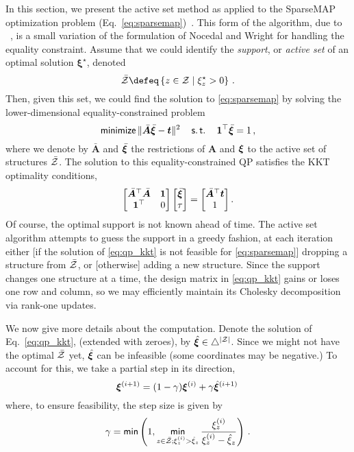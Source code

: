 In this section, we present the active set method
\citep[Chapters 16.4 \& 16.5]{nocedalwright} as applied to the SparseMAP
optimization problem (Eq.~\ref{eq:sparsemap})~\cite{niculae2018sparsemap}.
This form of the algorithm, due to ~\citet[Section 6]{ad3},
is a small variation of the formulation of Nocedal and Wright for handling
the equality constraint.
Assume that we could identify the \emph{support}, or
\emph{active set} of an optimal solution  $\bm{\xi}^\star$, denoted
\[\bar\ZZ \defeq \left\{z \in \ZZ \mid \xi^\star_z > 0\right\}\,. \]
Then, given this set, we could find the solution to \eqref{eq:sparsemap}
by solving the lower-dimensional equality-constrained problem
\begin{equation}
    \operatorname*{\mathsf{minimize}}\| \bar{\bm{A}}\bar{\bm{\xi}} - \bm{t} \|^2
    \quad\operatorname*{\mathsf{s.t.}}\quad\bm{1}^\top\bar{\bm{\xi}} = 1\,,
\end{equation}
where we denote by $\bar{\bm{A}}$ and $\bar{\bm{\xi}}$ the restrictions of $\bm{A}$
and $\bm{\xi}$ to the active set of structures $\bar{\mathcal{Z}}$.
The solution to this equality-constrained QP satisfies the KKT optimality
conditions,
\begin{equation}
    \label{eq:qp_kkt}
    \begin{bmatrix}
        {\bar{\bm{A}}}^\top \bar{\bm{A}} & \bm{1} \\
        \bm{1}^\top                      & 0      \\
    \end{bmatrix}
    \begin{bmatrix} \bar{\bm{\xi}} \\ \tau \end{bmatrix}
    =
    \begin{bmatrix} \bar{\bm{A}}^\top \bm{t} \\ 1 \end{bmatrix}.
\end{equation}
Of course, the optimal support is not known ahead of time. The active set
algorithm attempts to guess the support in a greedy fashion,
at each iteration either [if the solution of \eqref{eq:qp_kkt} is not feasible
        for \eqref{eq:sparsemap}]
dropping a structure from $\bar{\mathcal{Z}}$, or [otherwise] adding a new structure.
Since the support changes one structure at a time, the design matrix in
\eqref{eq:qp_kkt} gains or loses one row and column, so
we may efficiently maintain its Cholesky decomposition via rank-one updates.

We now give more details about the computation.
Denote the solution of Eq.~\ref{eq:qp_kkt}, (extended with zeroes),
by $\hat{\bm{\xi}} \in \triangle^{|\mathcal{Z}|}$.
Since we might not have the optimal $\bar{\mathcal{Z}}$ yet, $\hat{\bm{\xi}}$ can be infeasible
(some coordinates may be negative.)
To account for this, we take a partial step in its direction,
\begin{equation}
    \bm{\xi}^{(i+1)} = (1-\gamma)\bm{\xi}^{(i)} + \gamma \hat{\bm{\xi}}^{(i+1)}\,
\end{equation}
where, to ensure feasibility, the step size is given by
\begin{equation}\label{eq:step_size}
    \gamma = \operatorname*{\mathsf{min}} \left(1, \operatorname*{\mathsf{min}}_{z \in \bar{\mathcal{Z}}; \xi^{(i)}_z > \hat{\xi}_z}
    \frac{
        \xi^{(i)}_z
    }{
        \xi^{(i)}_z - \hat{\xi}_z}
    \right)\,.
\end{equation}

